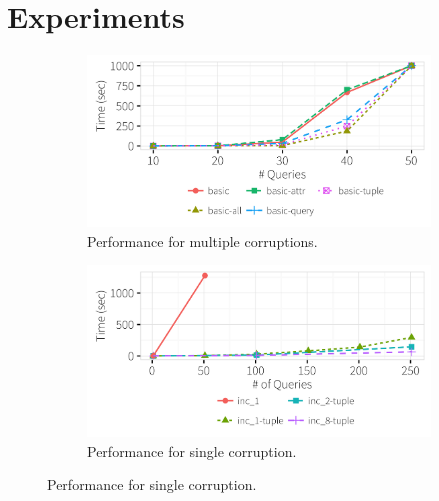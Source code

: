 
%
%
%
%
%
\section{Experiments}
\label{sec:experiments}


  \begin{figure}[h]
  \centering
    \vspace*{-.2in}
    \begin{subfigure}[t]{.3\textwidth}
    \includegraphics[width = .99\columnwidth]{figures/multi_time}
    \vspace*{-.25in}
    \caption{Performance for multiple corruptions.}
    \label{f:multi_time} 
    \end{subfigure}
    \begin{subfigure}[t]{.3\textwidth}
    \includegraphics[width = .99\columnwidth]{figures/incrementalcompare_time}
    \vspace*{-.25in}
    \caption{Performance for single corruption.}

\end{subfigure}
\end{figure}

